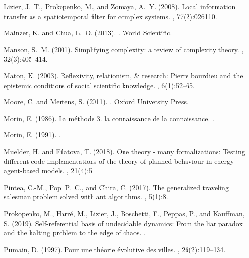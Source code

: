 \begin{thebibliography}{}
Lizier, J.~T., Prokopenko, M., and Zomaya, A.~Y. (2008).
\newblock Local information transfer as a spatiotemporal filter for complex
  systems.
, 77(2):026110.

Mainzer, K. and Chua, L.~O. (2013).
.
\newblock World Scientific.

Manson, S.~M. (2001).
\newblock Simplifying complexity: a review of complexity theory.
, 32(3):405--414.

Maton, K. (2003).
\newblock Reflexivity, relationism, \& research: Pierre bourdieu and the
  epistemic conditions of social scientific knowledge.
, 6(1):52--65.

Moore, C. and Mertens, S. (2011).
.
\newblock Oxford University Press.

Morin, E. (1986).
\newblock La m{\'e}thode 3. la connaissance de la connaissance.
.

Morin, E. (1991).
.

Muelder, H. and Filatova, T. (2018).
\newblock One theory - many formalizations: Testing different code
  implementations of the theory of planned behaviour in energy agent-based
  models.
, 21(4):5.

Pintea, C.-M., Pop, P.~C., and Chira, C. (2017).
\newblock The generalized traveling salesman problem solved with ant
  algorithms.
, 5(1):8.

Prokopenko, M., Harré, M., Lizier, J., Boschetti, F., Peppas, P., and
  Kauffman, S. (2019).
\newblock Self-referential basis of undecidable dynamics: From the liar paradox
  and the halting problem to the edge of chaos.
.

Pumain, D. (1997).
\newblock Pour une th{\'e}orie {\'e}volutive des villes.
, 26(2):119--134.


\end{thebibliography}
